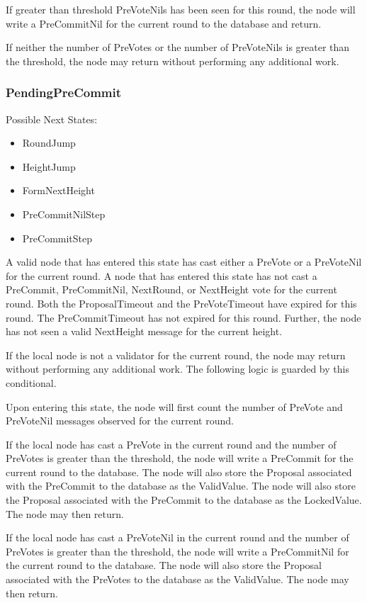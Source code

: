If greater than threshold PreVoteNils has been seen for this round, the
node will write a PreCommitNil for the current round to the database
and return.

If neither the number of PreVotes or the number of PreVoteNils is
greater than the threshold, the node may return without performing any
additional work.


\subsubsection{PendingPreCommit}
Possible Next States:

\begin{itemize}
    \item RoundJump
    \item HeightJump
    \item FormNextHeight
    \item PreCommitNilStep
    \item PreCommitStep
\end{itemize}

A valid node that has entered this state has cast either a PreVote or
a PreVoteNil for the current round.
A node that has entered this state has not cast a  PreCommit,
PreCommitNil, NextRound, or NextHeight vote for the current round.
Both the ProposalTimeout and the PreVoteTimeout have expired for this
round.
The PreCommitTimeout has not expired for this round.
Further, the node has not seen a valid NextHeight message for the
current height.

If the local node is not a validator for the current round, the node
may return without performing any additional work.
The following logic is guarded by this conditional.

Upon entering this state, the node will first count the number of
PreVote and PreVoteNil messages observed for the current round.

If the local node has cast a PreVote in the current round and the
number of PreVotes is greater than the threshold, the node will write a
PreCommit for the current round to the database.
The node will also store the Proposal associated with the PreCommit to
the database as the ValidValue.
The node will also store the Proposal associated with the PreCommit to
the database as the LockedValue.
The node may then return.

If the local node has cast a PreVoteNil in the current round and the
number of PreVotes is greater than the threshold, the node will write a
PreCommitNil for the current round to the database.
The node will also store the Proposal associated with the PreVotes to
the database as the ValidValue.
The node may then return.

